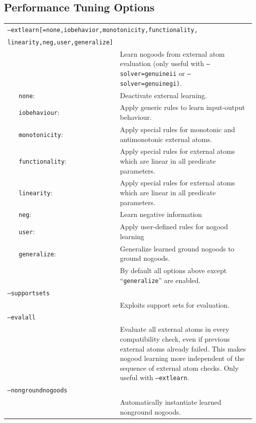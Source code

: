 \documentclass[a4paper, titlepage]{article}
\begin{document}
\subsection{Performance Tuning Options}
\begin{center}
\begin{longtable}{p{0.7cm}  p{2.2cm} p{0.3cm} p{6.3cm}  } 
\multicolumn{4}{p{6cm}}{\texttt{--extlearn[=none,iobehavior,monotonicity,functionality,}} \\
\multicolumn{3}{l}{\texttt{linearity,neg,user,generalize]}} \\
& & & Learn nogoods from external atom evaluation (only useful with \texttt{--solver=genuineii} or \texttt{--solver=genuinegi)}.\\
&\texttt{none}:& & Deactivate external learning. \\
&\texttt{iobehaviour}:& &Apply generic rules to learn input-output behaviour. \\
&\texttt{monotonicity}:& &Apply special rules for monotonic and antimonotonic external atoms.\\
&\texttt{functionality}:& &Apply special rules for external atoms which are linear in all predicate parameters.\\
&\texttt{linearity}:& &Apply special rules for external atoms which are linear in all predicate parameters.\\
&\texttt{neg}:& &Learn negative information\\
&\texttt{user}:& &Apply user-defined rules for nogood learning\\
&\texttt{generalize}:& &Generalize learned ground nogoods to ground nogoods.\\
& & & By default all options above except ``\texttt{generalize}'' are enabled.\\
\multicolumn{4}{l}{\texttt{--supportsets}}\\
& & &Exploits support sets for evaluation.\\
\multicolumn{4}{l}{\texttt{--evalall}}\\
& & &Evaluate all external atoms in every compatibility check, even if previous external atoms already failed.  This makes nogood learning more independent of the sequence of external atom checks. Only useful with \texttt{--extlearn}.\\
\multicolumn{4}{l}{\texttt{--nongroundnogoods}}\\
& & &Automatically instantiate learned nonground nogoods.\\

\end{longtable}
\end{center}
\end{document}

